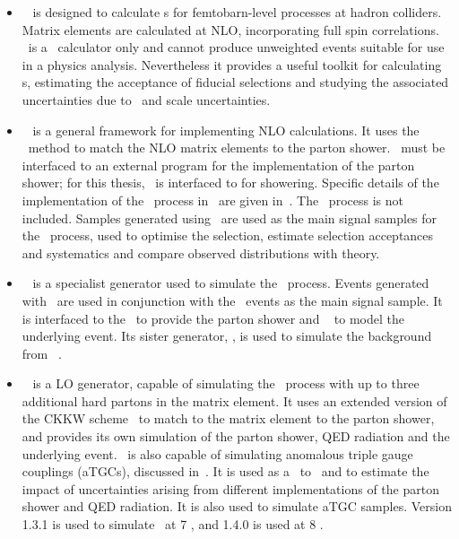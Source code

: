 \begin{itemize}
    \item \mcfm ~\cite{Campbell:2011} is designed to calculate \cx s for
    femtobarn-level processes at hadron colliders. Matrix elements are
    calculated at NLO, incorporating full spin correlations. \mcfm\ is a \cx\
    calculator only and cannot produce unweighted events suitable for use in a
    physics analysis. Nevertheless it provides a useful toolkit for calculating
    \cx s, estimating the acceptance of fiducial selections and studying the
    associated uncertainties due to \partDF\ and scale uncertainties.

    \item \powhegbox~\cite{Alioli:2010xd} is a general framework for implementing
    NLO calculations. It uses the \powheg\ method to match the NLO matrix
    elements to the parton shower. \powhegbox\ must be interfaced to an external
    program for the implementation of the parton shower; for this thesis,
    \powhegbox\ is interfaced to \pythia for showering. Specific details of the
    implementation of the \ZZ\ process in \powhegbox\ are given
    in~\cite{Melia:2011tj}. The \ggZZ\ process is not included. 
    Samples generated using \powhegbox\ are used as the main signal samples for
    the \qqZZ\ process, used to optimise the selection, estimate selection
    acceptances and systematics and compare observed distributions with theory.

    \item \ggtwoZZ~\cite{gg2ZZ} is a specialist generator used to simulate the
    \ggZZ\ process. Events generated with \ggtwoZZ\ are used in conjunction with
    the \powhegbox\ events as the main signal sample. It is interfaced to the
    \herwig\ to provide the parton shower and \jimmy~\cite{bib:jimmy} to model the underlying
    event. Its sister generator, \ggtwoWW, is used to simulate the background
    from \ggWW~\cite{Binoth:2006mf}.

    \item \sherpa~\cite{Gleisberg:2008ta} is a LO generator, capable of
    simulating the \qqZZ\ process with up to three additional hard partons in the matrix element. It
    uses an extended version of the CKKW scheme~\cite{Hoeche:2009rj} to match to the matrix element to the parton shower,
    and provides its own simulation of the parton shower, QED radiation and
    the underlying event. \sherpa\ is also capable of simulating anomalous
    triple gauge couplings (aTGCs), discussed in~\chap{TheoryZZProduction}. It is
    used as a \crosscheck\ to \powhegbox\ and to estimate the impact
    of uncertainties
    arising from different implementations of the parton shower and QED
    radiation. It is also used to simulate aTGC samples.
    Version 1.3.1 is used to simulate \qqZZllll\ at 7 \tev, and 1.4.0 is used at
    8 \tev.


\end{itemize}
